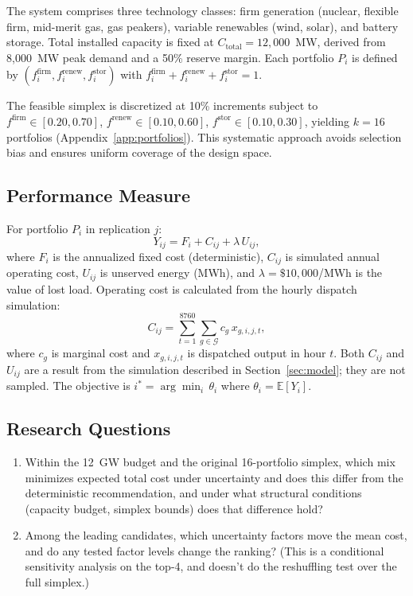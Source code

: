 \documentclass[11pt]{article}
\begin{document}
The system comprises three technology classes: firm generation (nuclear, flexible firm, mid-merit gas, gas peakers), variable renewables (wind, solar), and battery storage. Total installed capacity is fixed at $C_{\text{total}} = 12{,}000$~MW, derived from 8,000~MW peak demand and a 50\% reserve margin. Each portfolio $P_i$ is defined by $(f_i^{\text{firm}}, f_i^{\text{renew}}, f_i^{\text{stor}})$ with $f_i^{\text{firm}} + f_i^{\text{renew}} + f_i^{\text{stor}} = 1$.

The feasible simplex is discretized at 10\% increments subject to $f^{\text{firm}} \in [0.20, 0.70]$, $f^{\text{renew}} \in [0.10, 0.60]$, $f^{\text{stor}} \in [0.10, 0.30]$, yielding $k = 16$ portfolios (Appendix~\ref{app:portfolios}). This systematic approach avoids selection bias and ensures uniform coverage of the design space.

\subsection{Performance Measure}

For portfolio $P_i$ in replication $j$:
\begin{equation}\label{eq:Y}
  Y_{ij} = F_i + C_{ij} + \lambda \, U_{ij},
\end{equation}
where $F_i$ is the annualized fixed cost (deterministic), $C_{ij}$ is simulated annual operating cost, $U_{ij}$ is unserved energy (MWh), and $\lambda = \$10{,}000$/MWh is the value of lost load. Operating cost is calculated from the hourly dispatch simulation:
\begin{equation}\label{eq:C}
  C_{ij} = \sum_{t=1}^{8760} \sum_{g \in \mathcal{G}} c_g \, x_{g,i,j,t},
\end{equation}
where $c_g$ is marginal cost and $x_{g,i,j,t}$ is dispatched output in hour $t$. Both $C_{ij}$ and $U_{ij}$ are a result from the simulation described in Section~\ref{sec:model}; they are not sampled. The objective is $i^* = \arg\min_i \, \theta_i$ where $\theta_i = \mathbb{E}[Y_i]$.

\subsection{Research Questions}

\begin{enumerate}[leftmargin=*, itemsep=2pt]
  \item Within the 12~GW budget and the original 16-portfolio simplex, which mix minimizes expected total cost under uncertainty and does this differ from the deterministic recommendation, and under what structural conditions (capacity budget, simplex bounds) does that difference hold?
  \item Among the leading candidates, which uncertainty factors move the mean cost, and do any tested factor levels change the ranking? (This is a conditional sensitivity analysis on the top-4, and doesn't do the reshuffling test over the full simplex.)
\end{enumerate}
\end{document}

